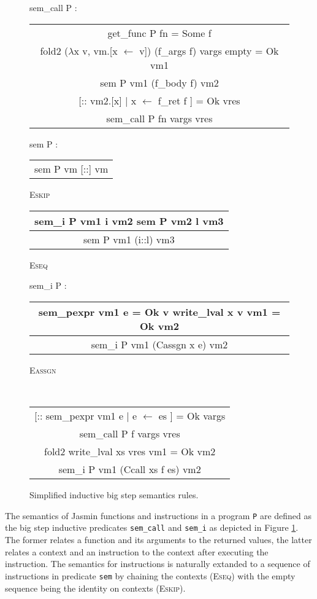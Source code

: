 \documentclass{article}
\begin{document}
\begin{figure}[p]
\ttfamily
sem\_call P :
\begin{center}
\begin{tabular}{c}
get\_func P fn = Some f \\
fold2 (\(\lambda\)x v, vm.[x \(\gets\) v]) (f\_args f) vargs empty = Ok vm1 \\
sem P vm1 (f\_body f) vm2 \\
{}[:: vm2.[x] | x \(\gets\) f\_ret f ] = Ok vres
\\\hline
sem\_call P fn vargs vres
\end{tabular}
\end{center}

sem P :
\begin{center}
\begin{tabular}{c}
\\\hline
sem P vm [::] vm
\end{tabular} \textrm{\textsc{Eskip}}\quad
\begin{tabular}{c}
sem\_i P vm1 i vm2\quad
sem P vm2 l vm3
\\\hline
sem P vm1 (i::l) vm3
\end{tabular} \textrm{\textsc{Eseq}}
\end{center}

sem\_i P :
\begin{center}
\begin{tabular}{c}
sem\_pexpr vm1 e = Ok v\quad
write\_lval x v vm1 = Ok vm2
\\\hline
sem\_i P vm1 (Cassgn x e) vm2
\end{tabular} \textrm{\textsc{Eassgn}}

~

\begin{tabular}{c}
[:: sem\_pexpr vm1 e | e \(\gets\) es ] = Ok vargs \\
sem\_call P f vargs vres \\
fold2 write\_lval xs vres vm1 = Ok vm2
\\\hline
sem\_i P vm1 (Ccall xs f es) vm2
\end{tabular} 
\end{center}
\normalfont%
\caption{Simplified inductive big step semantics rules.}\label{fig:semall}
\end{figure}

The semantics of Jasmin functions and instructions in a program \texttt{P} are
defined as the big step inductive predicates \texttt{sem\_call} and
\texttt{sem\_i} as depicted in Figure \ref{fig:semall}. The former relates a
function and its arguments to the returned values, the latter relates a context
and an instruction to the context after executing the instruction. The semantics
for instructions is naturally extanded to a sequence of instructions in
predicate \texttt{sem} by chaining the contexts (\textsc{Eseq}) with the empty
sequence being the identity on contexts (\textsc{Eskip}).
\end{document}
